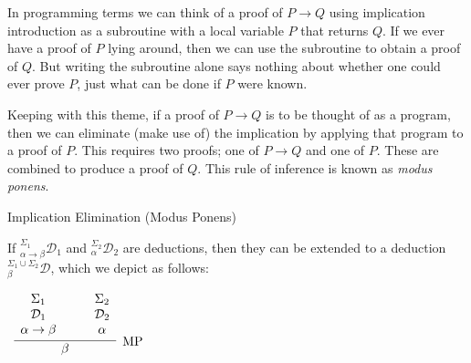 \documentclass{book}
\begin{document}
    In programming terms we can think of a proof of $P \to Q$ using implication introduction as a subroutine with a local variable $P$ that returns $Q$. If we ever have a proof of $P$ lying around, then we can use the subroutine to obtain a proof of $Q$. But writing the subroutine alone says nothing about whether one could ever prove $P$, just what can be done if $P$ were known. 

    Keeping with this theme, if a proof of $P \to Q$ is to be thought of as a program, then we can eliminate (make use of) the implication by applying that program to a proof of $P$. This requires two proofs; one of $P \to Q$ and one of $P$. These are combined to produce a proof of $Q$. This rule of inference is known as \emph{modus ponens}.

    \vspace{0.1cm}
    
    \begin{definition}{Implication Elimination (Modus Ponens)}

        If $^{\Sigma_{1}}_{\alpha \rightarrow \beta}\mathcal{D}_{1}$ and $^{\Sigma_{2}}_{\alpha}\mathcal{D}_{2}$ are deductions, then they can be extended to a deduction $^{\Sigma_{1}\cup \Sigma_{2}}_{\beta}\mathcal{D}$, which we depict as follows: 

        \begin{center}
            $\begin{array}{c}		
                \infer[\MP]{\beta}{\begin{array}{c} \Sigma_{1} \\ \mathcal{D}_{1} \\ \alpha \rightarrow \beta \end{array} \quad & \begin{array}{c} \Sigma_{2} \\ \mathcal{D}_{2} \\ \alpha \end{array}}	
            \end{array}$
        \end{center}
    \end{definition}
\end{document}
